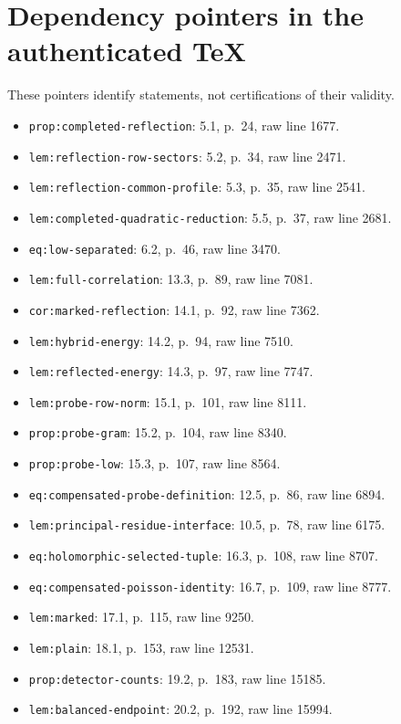 \documentclass[12pt]{article}
\begin{document}
\section{Dependency pointers in the authenticated TeX}
These pointers identify statements, not certifications of their validity.
\begin{itemize}
\item \nolinkurl{prop:completed-reflection}: 5.1, p.~24, raw line 1677.
\item \nolinkurl{lem:reflection-row-sectors}: 5.2, p.~34, raw line 2471.
\item \nolinkurl{lem:reflection-common-profile}: 5.3, p.~35, raw line 2541.
\item \nolinkurl{lem:completed-quadratic-reduction}: 5.5, p.~37, raw line 2681.
\item \nolinkurl{eq:low-separated}: 6.2, p.~46, raw line 3470.
\item \nolinkurl{lem:full-correlation}: 13.3, p.~89, raw line 7081.
\item \nolinkurl{cor:marked-reflection}: 14.1, p.~92, raw line 7362.
\item \nolinkurl{lem:hybrid-energy}: 14.2, p.~94, raw line 7510.
\item \nolinkurl{lem:reflected-energy}: 14.3, p.~97, raw line 7747.
\item \nolinkurl{lem:probe-row-norm}: 15.1, p.~101, raw line 8111.
\item \nolinkurl{prop:probe-gram}: 15.2, p.~104, raw line 8340.
\item \nolinkurl{prop:probe-low}: 15.3, p.~107, raw line 8564.
\item \nolinkurl{eq:compensated-probe-definition}: 12.5, p.~86, raw line 6894.
\item \nolinkurl{lem:principal-residue-interface}: 10.5, p.~78, raw line 6175.
\item \nolinkurl{eq:holomorphic-selected-tuple}: 16.3, p.~108, raw line 8707.
\item \nolinkurl{eq:compensated-poisson-identity}: 16.7, p.~109, raw line 8777.
\item \nolinkurl{lem:marked}: 17.1, p.~115, raw line 9250.
\item \nolinkurl{lem:plain}: 18.1, p.~153, raw line 12531.
\item \nolinkurl{prop:detector-counts}: 19.2, p.~183, raw line 15185.
\item \nolinkurl{lem:balanced-endpoint}: 20.2, p.~192, raw line 15994.
\end{itemize}
\end{document}
